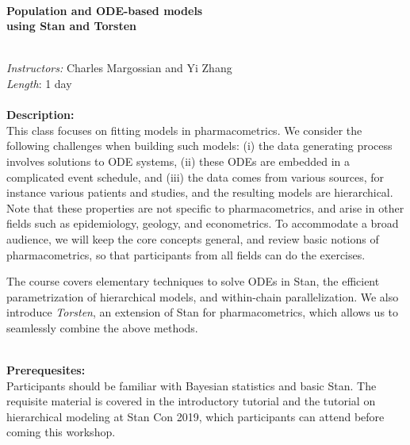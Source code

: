 \documentclass[12pt]{article}
\begin{document}
\noindent \\
\textbf{
{\Large Population and ODE-based models \\ using Stan and Torsten}}

\ \\
\textit{Instructors:} Charles Margossian and Yi Zhang \\
\textit{Length}: 1 day  \\

\ \\
\textbf{Description:} \\
This class focuses on fitting models in pharmacometrics.
We consider the following challenges when building such models: 
(i) the data generating process involves solutions to ODE systems,
(ii) these ODEs are embedded in a complicated event schedule,
and (iii) the data comes from various sources, for instance various patients and studies,
and the resulting models are hierarchical.
Note that these properties are not specific to pharmacometrics,
and arise in other fields such as epidemiology, geology, and econometrics.
To accommodate a broad audience, we will keep the core concepts general,
and review basic notions of pharmacometrics, so that participants from all fields
can do the exercises.

The course covers elementary techniques to solve ODEs in Stan,
the efficient parametrization of hierarchical models,
and within-chain parallelization.
We also introduce \textit{Torsten}, an extension of Stan for pharmacometrics,
which allows us to seamlessly combine the above methods.

\ \\
\textbf{Prerequesites:} \\
Participants should be familiar with Bayesian statistics and basic Stan.
The requisite material is covered in the introductory tutorial and the tutorial on hierarchical modeling
at Stan Con 2019, which participants can attend before coming this workshop.
\end{document}
